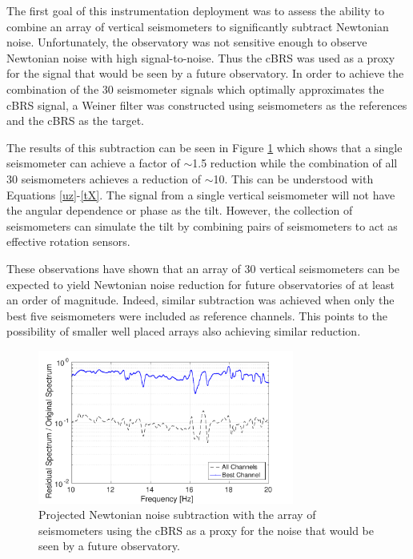 \documentclass [12pt, proquest]{uwthesis}[2019]
\begin{document}
The first goal of this instrumentation deployment was to assess the ability to combine an array of vertical seismometers to significantly subtract Newtonian noise. Unfortunately, the observatory was not sensitive enough to observe Newtonian noise with high signal-to-noise. Thus the cBRS was used as a proxy for the signal that would be seen by a future observatory. In order to achieve the combination of the 30 seismometer signals which optimally approximates the cBRS signal, a Weiner filter was constructed using seismometers as the references and the cBRS as the target. 

The results of this subtraction can be seen in Figure \ref{NNSub} \cite{NN} which shows that a single seismometer can achieve a factor of $\sim$1.5 reduction while the combination of all 30 seismometers achieves a reduction of $\sim$10. This can be understood with Equations \ref{uz}-\ref{tX}. The signal from a single vertical seismometer will not have the angular dependence or phase as the tilt. However, the collection of seismometers can simulate the tilt by combining pairs of seismometers to act as effective rotation sensors.

These observations have shown that an array of 30 vertical seismometers can be expected to yield Newtonian noise reduction for future observatories of at least an order of magnitude. Indeed, similar subtraction was achieved when only the best five seismometers were included as reference channels. This points to the possibility of smaller well placed arrays also achieving similar reduction.

\begin{figure}[!h]
\begin{center}
\includegraphics[width=0.75\textwidth]{NNSubtraction.pdf}
\end{center}
\caption[Projected Newtonian noise subtraction with the array of seismometers]{Projected Newtonian noise subtraction with the array of seismometers using the cBRS as a proxy for the noise that would be seen by a future observatory.}
\label{NNSub}
\end{figure}
\end{document}
